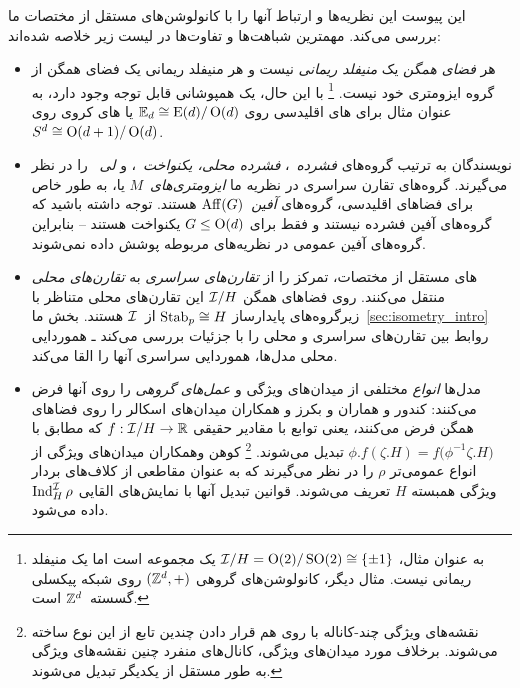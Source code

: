 این پیوست این نظریه‌ها و ارتباط آنها را با کانولوشن‌های مستقل از مختصات ما بررسی می‌کند.
مهمترین شباهت‌ها و تفاوت‌ها در لیست زیر خلاصه شده‌اند:
\begin{itemize}
	\item[{\rule[2.2pt]{2pt}{2pt}}]
	هر \emph{فضای همگن} یک \emph{منیفلد ریمانی} نیست و هر منیفلد ریمانی یک فضای همگن از گروه ایزومتری خود نیست.%
	\footnote{
		به عنوان مثال، $\mathcal{I}/H = \operatorname{O}(2)/\operatorname{SO}(2) \cong \{\pm1\}$ یک مجموعه است اما یک منیفلد ریمانی نیست.
		مثال دیگر، کانولوشن‌های گروهی $(\mathbb{Z}^d,+)$ روی شبکه پیکسلی گسسته~$\mathbb{Z}^d$ است.
	}
	با این حال، یک همپوشانی قابل توجه وجود دارد، به عنوان مثال برای های اقلیدسی روی $\mathbb{E}_d \cong \operatorname{E}(d)/\operatorname{O}(d)$ یا های کروی روی $S^d \cong \operatorname{O}(d+1)/\operatorname{O}(d)$.
	\item[{\rule[2.2pt]{2pt}{2pt}}]
	نویسندگان به ترتیب گروه‌های \emph{فشرده}~\cite{Kondor2018-GENERAL}، \emph{فشرده محلی، یکنواخت}~\cite{Cohen2018-intertwiners}\cite{Cohen2019-generaltheory}، و \emph{لی}~\cite{bekkers2020bspline} را در نظر می‌گیرند.
	گروه‌های تقارن سراسری در نظریه ما \emph{ایزومتری‌های}~$M$ یا، به طور خاص برای فضاهای اقلیدسی، گروه‌های \emph{آفين}~$\operatorname{Aff}(G)$ هستند.
	توجه داشته باشید که گروه‌های آفين فشرده نیستند و فقط برای $G\leq\operatorname{O}(d)$ یکنواخت هستند -- بنابراین گروه‌های آفين عمومی در نظریه‌های مربوطه پوشش داده نمی‌شوند.
	\item[{\rule[2.2pt]{2pt}{2pt}}]
	های مستقل از مختصات، تمرکز را از \emph{تقارن‌های سراسری} به \emph{تقارن‌های محلی} منتقل می‌کنند.
	روی فضاهای همگن $\mathcal{I}/H$ این تقارن‌های محلی متناظر با زیرگروه‌های پایدارساز $\operatorname{Stab}_{p} \cong H$ از~$\mathcal{I}$ هستند.
	بخش ما~\ref{sec:isometry_intro} روابط بین تقارن‌های سراسری و محلی را با جزئیات بررسی می‌کند ـ
	هموردایی محلی مدل‌ها، هموردایی سراسری آنها را القا می‌کند.
	\item[{\rule[2.2pt]{2pt}{2pt}}]
	مدل‌ها \emph{انواع} مختلفی از میدان‌های ویژگی و \emph{عمل‌های گروهی} را روی آنها فرض می‌کنند:
	کندور و هماران\cite{Kondor2018-GENERAL} و بکرز و همکاران\cite{bekkers2020bspline} میدان‌های اسکالر را روی فضاهای همگن فرض می‌کنند، یعنی توابع با مقادیر حقیقی ${f: \mathcal{I}/H \to \mathbb{R}}$ که مطابق با
	$\phi.f (\zeta.H) = f\big( \phi^{-1} \zeta.H \big)$ تبدیل می‌شوند.%
	\footnote{
		نقشه‌های ویژگی چند-کاناله با روی هم قرار دادن چندین تابع از این نوع ساخته می‌شوند.
		برخلاف مورد میدان‌های ویژگی، کانال‌های منفرد چنین نقشه‌های ویژگی به طور مستقل از یکدیگر تبدیل می‌شوند.
	}
	کوهن وهمکاران\cite{Cohen2018-intertwiners}\cite{Cohen2019-generaltheory} میدان‌های ویژگی از انواع عمومی‌تر $\rho$ را در نظر می‌گیرند
	که به عنوان مقاطعی از کلاف‌های بردار ویژگی همبسته $H$ تعریف می‌شوند.
	قوانین تبدیل آنها با نمایش‌های القایی $\operatorname{Ind}_H^{\mathcal{I}} \rho$ داده می‌شود.

\end{itemize}
